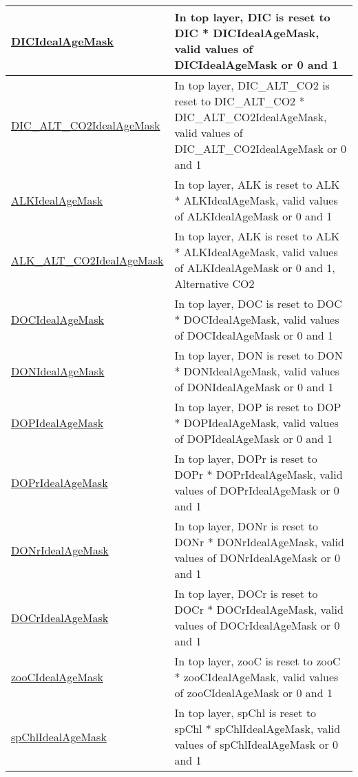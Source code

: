 {\begin{center}
\begin{longtable}{| p{2.0in} | p{4.0in} |}
    \hline
    \hyperref[subsec:var_sec_forcing_DICIdealAgeMask]{DICIdealAgeMask} & In top layer, DIC is reset to DIC * DICIdealAgeMask, valid values of DICIdealAgeMask or 0 and 1 \\
    \hline
    \hyperref[subsec:var_sec_forcing_DIC_ALT_CO2IdealAgeMask]{DIC\_ALT\_CO2IdealAgeMask} & In top layer, DIC\_ALT\_CO2 is reset to DIC\_ALT\_CO2 * DIC\_ALT\_CO2IdealAgeMask, valid values of DIC\_ALT\_CO2IdealAgeMask or 0 and 1 \\
    \hline
    \hyperref[subsec:var_sec_forcing_ALKIdealAgeMask]{ALKIdealAgeMask} & In top layer, ALK is reset to ALK * ALKIdealAgeMask, valid values of ALKIdealAgeMask or 0 and 1 \\
    \hline
    \hyperref[subsec:var_sec_forcing_ALK_ALT_CO2IdealAgeMask]{ALK\_ALT\_CO2IdealAgeMask} & In top layer, ALK is reset to ALK * ALKIdealAgeMask, valid values of ALKIdealAgeMask or 0 and 1, Alternative CO2 \\
    \hline
    \hyperref[subsec:var_sec_forcing_DOCIdealAgeMask]{DOCIdealAgeMask} & In top layer, DOC is reset to DOC * DOCIdealAgeMask, valid values of DOCIdealAgeMask or 0 and 1 \\
    \hline
    \hyperref[subsec:var_sec_forcing_DONIdealAgeMask]{DONIdealAgeMask} & In top layer, DON is reset to DON * DONIdealAgeMask, valid values of DONIdealAgeMask or 0 and 1 \\
    \hline
    \hyperref[subsec:var_sec_forcing_DOPIdealAgeMask]{DOPIdealAgeMask} & In top layer, DOP is reset to DOP * DOPIdealAgeMask, valid values of DOPIdealAgeMask or 0 and 1 \\
    \hline
    \hyperref[subsec:var_sec_forcing_DOPrIdealAgeMask]{DOPrIdealAgeMask} & In top layer, DOPr is reset to DOPr * DOPrIdealAgeMask, valid values of DOPrIdealAgeMask or 0 and 1 \\
    \hline
    \hyperref[subsec:var_sec_forcing_DONrIdealAgeMask]{DONrIdealAgeMask} & In top layer, DONr is reset to DONr * DONrIdealAgeMask, valid values of DONrIdealAgeMask or 0 and 1 \\
    \hline
    \hyperref[subsec:var_sec_forcing_DOCrIdealAgeMask]{DOCrIdealAgeMask} & In top layer, DOCr is reset to DOCr * DOCrIdealAgeMask, valid values of DOCrIdealAgeMask or 0 and 1 \\
    \hline
    \hyperref[subsec:var_sec_forcing_zooCIdealAgeMask]{zooCIdealAgeMask} & In top layer, zooC is reset to zooC * zooCIdealAgeMask, valid values of zooCIdealAgeMask or 0 and 1 \\
    \hline
    \hyperref[subsec:var_sec_forcing_spChlIdealAgeMask]{spChlIdealAgeMask} & In top layer, spChl is reset to spChl * spChlIdealAgeMask, valid values of spChlIdealAgeMask or 0 and 1 \\

\end{longtable}
\end{center}}
